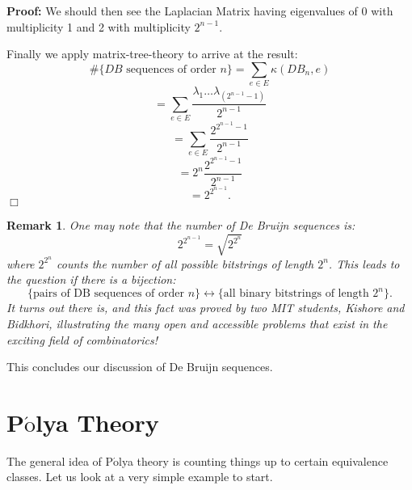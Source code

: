 \documentclass[11pt]{article}
\newtheorem{remark}[theorem]{Remark}
\newenvironment{proof}{\noindent \textbf{Proof:}}{$\Box$}
\begin{document}
\begin{proof}
We should then see the Laplacian Matrix having eigenvalues of 0 with multiplicity 1 and 2 with multiplicity $2^{n-1}$. 

Finally we apply matrix-tree-theory to arrive at the result:
	\[ \# \{DB \mbox{ sequences of order } n \} = \sum_{e\in E} \kappa (DB_n,e) \]
	\[ = \sum_{e \in E} \frac{ \lambda_1\hdots \lambda_{(2^{n-1} - 1)}}{2^{n-1}} \]
	\[ = \sum_{e \in E} \frac{2^{2^{n-1} - 1}}{2^{n-1}} \]
	\[=2^n \frac{2^{2^{n-1} -1}}{2^{n-1}} \]
	\[=2^{2^{n-1}}. \]
\end{proof}

\begin{remark}
One may note that the number of De Bruijn sequences is:
	\[2^{2^{n-1}} = \sqrt{2^{2^n}} \]
where $2^{2^n}$ counts the number of all possible bitstrings of length $2^n$. This leads to the question if there is a bijection:
	\[\{\mbox{pairs of DB sequences of order $n$} \} \leftrightarrow \{\mbox{all binary bitstrings of length } 2^n \} .\]
It turns out there is, and this fact was proved by two MIT students, Kishore and Bidkhori, illustrating the many open and accessible problems that exist in the exciting field of combinatorics!
\end {remark}

This concludes our discussion of De Bruijn sequences.

\section{P$\acute{\mbox{o}}$lya Theory}

The general idea of P$\acute{\mbox{o}}$lya theory is counting things up to certain equivalence classes. Let us look at a very simple example to start.
\end{document}
